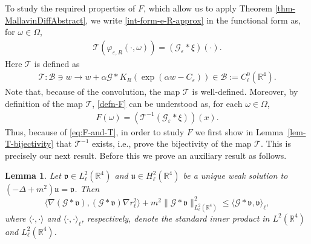 \documentclass{article}
\newcommand{\assign}{:=}
\newtheorem{lemma}{Lemma}
\begin{document}
To study the required properties of $F$, which allow us to apply Theorem
\ref{thm-MallavinDiffAbstract}, we write \eqref{int-form-e-R-approx} in the
functional form as, for $\omega \in \Omega$,
\begin{equation}
  \begin{array}{l}
    \mathcal{T} (\varphi_{\varepsilon, R} (\cdot, \omega)) =
    (\mathcal{G}_{\varepsilon} \ast \xi) (\cdot) .
  \end{array} \label{rel-varphi-0}
\end{equation}
Here $\mathcal{T}$ is defined as
\begin{equation}
  \begin{array}{l}
    \mathcal{T}: \mathcal{B} \ni w \rightarrow w + \alpha \mathcal{G} \ast K_R
    (\exp (\alpha w - C_{\varepsilon})) \in \mathcal{B} \assign
    C_{\ell}^0 (\mathbb{R}^4) .
  \end{array} \label{T-map}
\end{equation}
Note that, because of the convolution, the map $\mathcal{T}$ is well-defined.
Moreover, by definition of the map $\mathcal{T}$, \eqref{defn-F} can be
understood as, for each $\omega \in \Omega$,
\begin{equation}
  \begin{array}{l}
    F (\omega) = (\mathcal{T}^{- 1} (\mathcal{G}_{\varepsilon} \ast \xi)) (x)
    . \label{eq:F-and-T}
  \end{array}
\end{equation}
Thus, because of \eqref{eq:F-and-T}, in order to study $F$ we first show in
Lemma~\ref{lem-T-bijectivity} that $\mathcal{T}^{- 1}$ exists, i.e., prove the
bijectivity of the map $\mathcal{T}$. This is precisely our next result.
Before this we prove an auxiliary result as follows.
%
\begin{lemma}
  Let $\mathfrak{v} \in L_{\ell}^2 (\mathbb{R}^4) $ and $\mathfrak{u} \in
  H_{\ell}^2 (\mathbb{R}^4)$ be a unique weak solution to $(- \Delta + m^2)
  \mathfrak{u}=\mathfrak{v}$. Then
  \begin{equation}\label{est-poincare}
      \langle \nabla (\mathcal{G} \ast \mathfrak{v}), (\mathcal{G} \ast
      \mathfrak{v}) \nabla r_{\ell}^2 \rangle + m^2 \| \mathcal{G} \ast
      \mathfrak{v} \|_{L^2_{\ell} (\mathbb{R}^4)}^2 \leqslant \langle
      \mathcal{G} \ast \mathfrak{v}, \mathfrak{v} \rangle_{\ell},
  \end{equation}
  where $\langle \cdot, \cdot \rangle$ and $\langle \cdot, \cdot
  \rangle_{\ell}$, respectively, denote the standard inner product in $L^2
  (\mathbb{R}^4)$ and $L^2_{\ell} (\mathbb{R}^4)$. 
\end{lemma}
\end{document}
